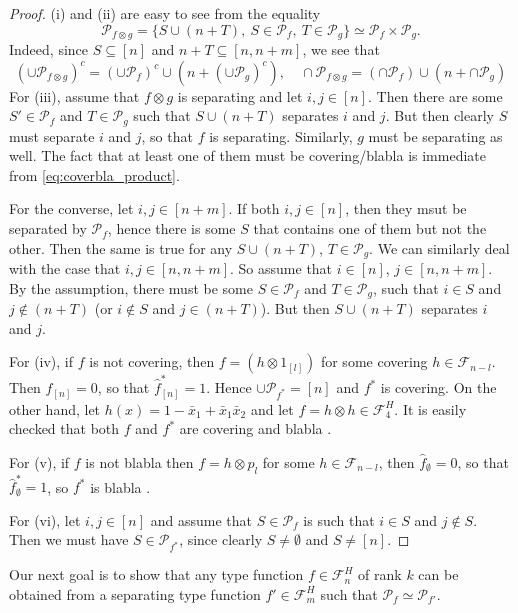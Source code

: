 \documentclass[12pt]{article}
\theoremstyle{definition}
\theoremstyle{remark}
\def\blabla{blabla }
\def\Pe{\mathcal P}
\def\Fe{\mathcal F}
\begin{document}
\begin{proof} 
(i) and (ii) are easy to see from the equality
\[
\Pe_{f\otimes g}=\{S\cup (n+T),\ S\in \Pe_f,\ T\in \Pe_g\}\simeq \Pe_f\times \Pe_g.
\]
Indeed, since $S\subseteq [n]$ and $n+T\subseteq [n,n+m]$, we see that 
\begin{equation}\label{eq:coverbla_product}
(\cup \Pe_{f\otimes g})^c=(\cup \Pe_f)^c\cup (n+(\cup\Pe_g)^c), \quad \cap \Pe_{f\otimes g}=(\cap \Pe_f)\cup (n+\cap\Pe_g)
\end{equation}
For (iii), assume that $f\otimes g$ is separating and let $i,j\in [n]$. Then there are
some $S'\in \Pe_f$ and $T\in \Pe_g$ such that $S\cup (n+T)$ separates $i$ and $j$. But
then clearly $S$ must separate $i$ and $j$, so that $f$ is separating. Similarly, $g$ must
be separating as well. The fact that at least one of them must be covering/blabla is
immediate from \eqref{eq:coverbla_product}. 
 
 For the converse, let $i,j\in [n+m]$. If both $i,j\in [n]$, then they msut be separated
 by $\Pe_f$, hence there is some $S$ that contains one of them but not the other. Then the
 same is true for any $S\cup (n+T)$, $T\in \Pe_g$. We can similarly deal with the case
 that $i,j\in [n,n+m]$. So assume that $i\in [n]$, $j\in [n,n+m]$. By the assumption,
 there must be some $S\in \Pe_f$ and $T\in \Pe_g$, such that $i\in S$ and $j\notin (n+T)$
 (or $i\notin S$ and $j\in (n+T)$). But then $S\cup (n+T)$ separates $i$ and $j$. 

For (iv), if $f$ is not covering, then $f=(h\otimes 1_{[l]})$ for some covering $h\in
\Fe_{n-l}$. Then $\hat f_{[n]}=0$, so that $\hat f^*_{[n]}=1$. Hence $\cup\Pe_{f^*}=[n]$
and $f^*$ is covering. On the other hand, let 
$h(x)=1-\bar x_1+\bar x_1\bar x_2$ and let $f=h\otimes h\in \Fe_4^H$. It is easily checked
that both $f$ and $f^*$ are covering and \blabla.

For (v), if $f$ is not \blabla then $f=h\otimes p_l$ for some $h\in \Fe_{n-l}$, then $\hat
f_\emptyset =0$, so that $\hat f^*_\emptyset =1$, so $f^*$ is \blabla.

For (vi), let $i,j\in [n]$ and assume that $S\in \Pe_f$ is such that $i\in S$ and $j\notin
S$. Then we must have $S\in \Pe_{f^*}$, since clearly $S\neq \emptyset$ and $S\neq
[n]$. 


\end{proof}




Our next goal is to show that any type function $f\in \Fe_n^H$ of rank $k$ can be obtained 
from a separating type function  $f'\in \Fe_m^H$ such that $\Pe_f\simeq \Pe_{f'}$.
\end{document}
